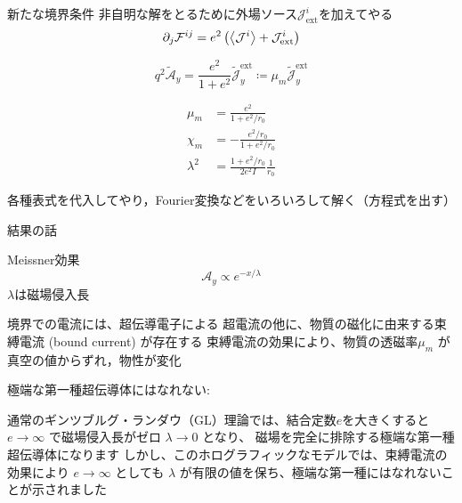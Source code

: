 \documentclass[b5paper,11pt,dvipdfmx]{jsarticle}
\numberwithin{equation}{section}
\theoremstyle{definition}
\begin{document}
新たな境界条件
非自明な解をとるために外場ソース$\mathcal{J}_{\text{ext}}^i$を加えてやる
\begin{equation}
    \partial_{j} \mathcal{F}^{ij}
    = e^{2} \left( \ev{\mathcal{J}^{i}} + \mathcal{J}_{\text{ext}}^i \right)
\end{equation}

\begin{equation}
    q^2 \tilde{\mathcal{A}}_y
    = \frac{e^2}{1 + e^2} \tilde{\mathcal{J}}^{\text{ext}}_y
    \coloneq \mu_m \tilde{\mathcal{J}}^{\text{ext}}_y
\end{equation}







\begin{equation}
    \begin{split}
            \mu_m
            &= \frac{e^2}{1 + e^2 / r_0}\\
            \chi_m
            &= - \frac{e^2 / r_0}{1 + e^2 / r_0}\\
            \lambda^2
            &= \frac{1 + e^2 / r_0}{2 e^2 I}\frac{1}{r_0}
    \end{split}
\end{equation}


















各種表式を代入してやり，Fourier変換などをいろいろして解く（方程式を出す）



結果の話

Meissner効果
\begin{equation}
    \mathcal{A}_{y}\propto e^{-x/\lambda}
\end{equation}
$\lambda$は磁場侵入長

境界での電流には、超伝導電子による
超電流の他に、物質の磁化に由来する束縛電流 (bound current) が存在する
束縛電流の効果により、物質の透磁率$\mu_m$ が真空の値からずれ，物性が変化

極端な第一種超伝導体にはなれない:

通常のギンツブルグ・ランダウ（GL）理論では、結合定数$e$を大きくすると
$e\rightarrow\infty$ で磁場侵入長がゼロ $\lambda \to 0$ となり、
磁場を完全に排除する極端な第一種超伝導体になります
しかし、このホログラフィックなモデルでは、束縛電流の効果により
$e\rightarrow\infty$ としても $\lambda$ が有限の値を保ち、極端な第一種にはなれないことが示されました
\end{document}
